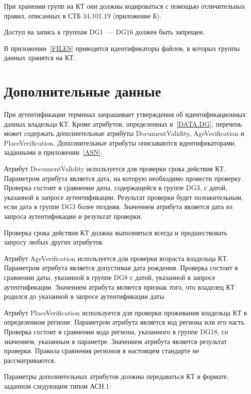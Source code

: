 При хранении групп на КТ они должны кодироваться с помощью отличительных 
правил, описанных в СТБ 34.101.19 (приложение Б). 

Доступ на запись к группам DG1~--- DG16 должен быть запрещен.
 
В приложении~\ref{FILES} приводятся идентификаторы файлов, 
в которых группы данных хранятся на КТ.

\section{Дополнительные данные}\label{DATA.Optional}

При аутентификации терминал запрашивает утверждения об идентификационных
данных владельца КТ. Кроме атрибутов, определенных в~\ref{DATA.DG}, 
перечень может содержать дополнительные атрибуты DocumentValidity, 
AgeVerification и PlaceVerification. Дополнительные атрибуты описываются 
идентификаторами, заданными в приложении~\ref{ASN}. 

Атрибут DocumentValidity используется для проверки срока действия КТ. 
Параметром атрибута является дата, на которую необходимо провести 
проверку. Проверка состоит в сравнении даты, содержащейся в группе DG3, с 
датой, указанной в запросе аутентификации. Результат проверки будет 
положительным, если дата в группе DG3 более поздняя. Значением атрибута 
является дата из запроса аутентификации и результат проверки. 

Проверка срока действия КТ должна выполняться всегда и предшествовать 
запросу любых других атрибутов. 

Атрибут AgeVerification используется для проверки возраста владельца КТ. 
Параметром атрибута является допустимая дата рождения. Проверка состоит в 
сравнении даты, указанной в группе DG8 с датой, указанной в запросе 
аутентификации. Значением атрибута является признак того, что владелец КТ 
родился до указанной в запросе аутентификации даты. 

Атрибут PlaceVerification используется для проверки проживания владельца 
КТ в определенном регионе. Параметром атрибута является код региона или 
его часть. Проверка состоит в сравнении кода региона, указанного в группе 
DG18, со значением, указанным в параметре. Значением атрибута является 
результат проверки. Правила сравнения регионов в настоящем стандарте не 
рассматриваются. 


Параметры дополнительных атрибутов должны передаваться КТ в формате, 
заданном следующим типом АСН.1: 

